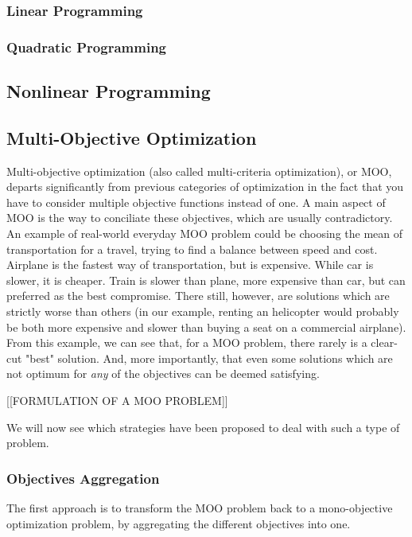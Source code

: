 \subsubsection{Linear Programming}
\subsubsection{Quadratic Programming}
\subsection{Nonlinear Programming}

\subsection{Multi-Objective Optimization}

Multi-objective optimization (also called multi-criteria optimization), or MOO, departs significantly from previous categories of optimization in the fact that you have to consider multiple objective functions instead of one. A main aspect of MOO is the way to conciliate these objectives, which are usually contradictory.
An example of real-world everyday MOO problem could be choosing the mean of transportation for a travel, trying to find a balance between speed and cost. Airplane is the fastest way of transportation, but is expensive. While car is slower, it is cheaper. Train is slower than plane, more expensive than car, but can preferred as the best compromise. There still, however, are solutions which are strictly worse than others (in our example, renting an helicopter would probably be both more expensive and slower than buying a seat on a commercial airplane).
From this example, we can see that, for a MOO problem, there rarely is a clear-cut "best" solution. And, more importantly, that even some solutions which are not optimum for \emph{any} of the objectives can be deemed satisfying. 


[[FORMULATION OF A MOO PROBLEM]]

We will now see which strategies have been proposed to deal with such a type of problem.

\subsubsection{Objectives Aggregation}

The first approach is to transform the MOO problem back to a mono-objective optimization problem, by aggregating the different objectives into one.

